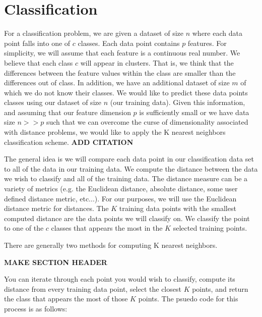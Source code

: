 \chapter{Classification}

\vspace{5 mm}
\noindent
For a classification problem, we are given a dataset of size $n$ where each 
data point falls into one of $c$ classes. Each data point contains $p$ features. 
For simplicity, we will assume that each feature is a continuous real number. 
We believe that each class $c$ will appear in clusters. That is, we think that 
the differences between the feature values within the class are smaller than 
the differences out of class. In addition, we have an additional dataset of 
size $m$ of which we do not know their classes. We would like to predict these 
data points classes using our dataset of size $n$ (our training data). Given 
this information, and assuming that our feature dimension $p$ is sufficiently 
small or we have data size $n >> p$ such that we can overcome the curse of 
dimensionality associated with distance problems, we would like to apply the 
K nearest neighbors classification scheme.
\textbf{ADD CITATION}

\vspace{5 mm}
\noindent
The general idea is we will compare each data point in our classification data 
set to all of the data in our training data. We compute the distance between 
the data we wish to classify and all of the training data. The distance measure 
can be a variety of metrics (e.g. the Euclidean distance, absolute distance, 
some user defined distance metric, etc...). For our purposes, we will use the 
Euclidean distance metric for distances. The $K$ training data points with the 
smallest computed distance are the data points we will classify on. We classify 
the point to one of the $c$ classes that appears the most in the $K$ selected 
training points.

\vspace{5 mm}
\noindent
There are generally two methods for computing K nearest neighbors.

\vspace{5 mm}
\noindent
\textbf{MAKE SECTION HEADER}

You can iterate through each point you would wish to classify, compute its 
distance from every training data point, select the closest $K$ points, and 
return the class that appears the most of those $K$ points. The psuedo code for 
this process is as follows:


